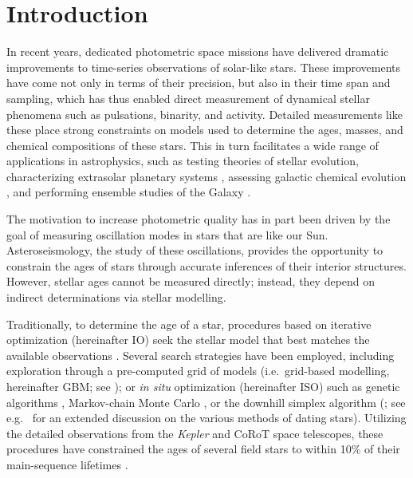 \documentclass[twocolumn,twocolappendix]{aastex6}
\begin{document}


\section{Introduction}

In recent years, dedicated photometric space missions have delivered dramatic improvements to time-series observations of solar-like stars. These improvements have come not only in terms of their precision, but also in their time span and sampling, which has thus enabled direct measurement of dynamical stellar phenomena such as pulsations, binarity, and activity. Detailed measurements like these place strong constraints on models used to determine the ages, masses, and chemical compositions of these stars. This in turn facilitates a wide range of applications in astrophysics, such as testing theories of stellar evolution, characterizing extrasolar planetary systems \citep[e.g.][]{2015ApJ...799..170C, 2015MNRAS.452.2127S}, assessing galactic chemical evolution \citep[e.g.][]{2015ASSP...39..111C}, and performing ensemble studies of the Galaxy \citep[e.g.][]{2011Sci...332..213C, 2013MNRAS.429..423M, 2014ApJS..210....1C}. 

The motivation to increase photometric quality has in part been driven by the goal of measuring oscillation modes in stars that are like our Sun. Asteroseismology, the study of these oscillations, provides the opportunity to constrain the ages of stars through accurate inferences of their interior structures. However, stellar ages cannot be measured directly; instead, they depend on indirect determinations via stellar modelling. 

Traditionally, to determine the age of a star, procedures based on iterative optimization (hereinafter IO) seek the stellar model that best matches the available observations \citep{1994ApJ...427.1013B}. 
Several search strategies have been employed, including exploration through a pre-computed grid of models (i.e.\ grid-based modelling, hereinafter GBM; see \citealt{2011ApJ...730...63G, 2014ApJS..210....1C}); or \emph{in situ} optimization (hereinafter ISO) such as genetic algorithms \citep{2014ApJS..214...27M}, Markov-chain Monte Carlo \citep{2012MNRAS.427.1847B}, or the downhill simplex algorithm (\citealt{2013ApJS..208....4P}; see e.g.\ \citealt{2015MNRAS.452.2127S} for an extended discussion on the various methods of dating stars). Utilizing the detailed observations from the \emph{Kepler} and CoRoT space telescopes, these procedures have constrained the ages of several field stars to within 10\% of their main-sequence lifetimes \citep{2015MNRAS.452.2127S}. 
\end{document}
